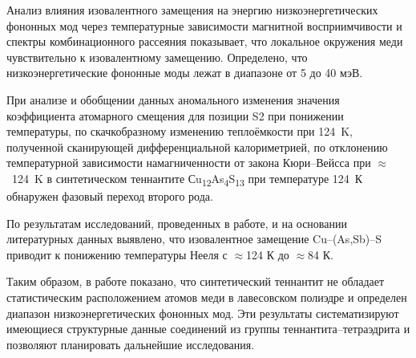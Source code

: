 %

Анализ влияния изовалентного замещения на энергию низкоэнергетических фононных мод через температурные зависимости магнитной восприимчивости и спектры комбинационного рассеяния показывает, что локальное окружения меди чувствительно к изовалентному замещению. Определено, что низкоэнергетические фононные моды лежат в диапазоне от 5 до 40 мэВ.

При анализе и обобщении данных аномального изменения значения коэффициента атомарного смещения для позиции S2 при понижении температуры, по скачкобразному изменению теплоёмкости при 124~K, полученной сканирующей дифференциальной калориметрией, по отклонению температурной зависимости намагниченности от закона Кюри--Вейсса при $\approx$~124~K в синтетическом теннантите Сu\textsubscript{12}As\textsubscript{4}S\textsubscript{13} при температуре 124~К обнаружен фазовый переход второго рода.

По результатам исследований, проведенных в работе, и на основании литературных данных выявлено, что изовалентное замещение Cu--(As,Sb)--S приводит к понижению температуры Нееля с $\approx$124 К до $\approx$84 К.

Таким образом, в работе показано, что синтетический теннантит не обладает статистическим расположением атомов меди в лавесовском полиэдре и определен диапазон низкоэнергетических фононных мод.
Эти результаты систематизируют имеющиеся структурные данные соединений из группы  теннантита--тетраэдрита и позволяют планировать дальнейшие исследования.

\newpage
